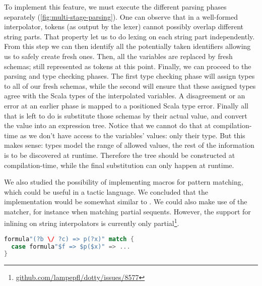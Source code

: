 To implement this feature, we must execute the different parsing phases separately (\autoref{fig:multi-stage-parsing}). One can observe that in a well-formed interpolator, tokens (as output by the lexer) cannot possibly overlap different string parts. That property let us to do lexing on each string part independently. From this step we can then identify all the potentially taken identifiers allowing us to safely create fresh ones. Then, all the variables are replaced by fresh schemas; still represented as tokens at this point. Finally, we can proceed to the parsing and type checking phases. The first type checking phase will assign types to all of our fresh schemas, while the second will ensure that these assigned types agree with the Scala types of the interpolated variables. A disagreement or an error at an earlier phase is mapped to a positioned Scala type error. Finally all that is left to do is substitute those schemas by their actual value, and convert the value into an expression tree. Notice that we cannot do that at compilation-time as we don't have access to the variables' values: only their type. But this makes sense: types model the range of allowed values, the rest of the information is to be discovered at runtime. Therefore the tree should be constructed at compilation-time, while the final substitution can only happen at runtime.

We also studied the possibility of implementing  macros for pattern matching, which could be useful in a tactic language. We concluded that the implementation would be somewhat similar to . We could also make use of the matcher, for instance when matching partial sequents. However, the support for inlining on string interpolators  is currently only partial\footnote{\href{https://github.com/lampepfl/dotty/issues/8577}{github.com/lampepfl/dotty/issues/8577}}.

\begin{lstlisting}[language=Scala,caption={[String interpolation unapply]{An example of the possibilities offered by unapply and string interpolators. This is not currently implemented.}},label={lst:string-interpolator-unapply}]
formula"(?b \/ ?c) => p(?x)" match {
  case formula"$f => $p($x)" => ...
}
\end{lstlisting}

